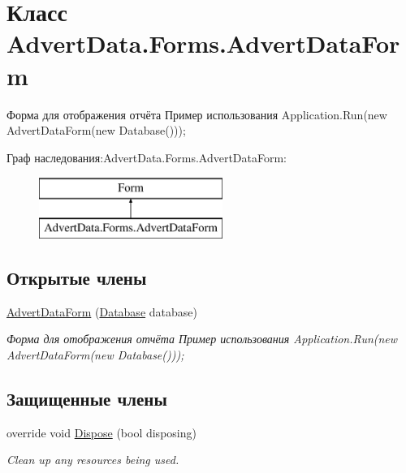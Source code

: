 \hypertarget{class_advert_data_1_1_forms_1_1_advert_data_form}{\section{Класс Advert\+Data.\+Forms.\+Advert\+Data\+Form}
\label{class_advert_data_1_1_forms_1_1_advert_data_form}
}


Форма для отображения отчёта Пример использования Application.\+Run(new Advert\+Data\+Form(new Database()));  


Граф наследования\+:Advert\+Data.\+Forms.\+Advert\+Data\+Form\+:\begin{figure}[H]
\begin{center}
\leavevmode
\includegraphics[height=2.000000cm]{class_advert_data_1_1_forms_1_1_advert_data_form}
\end{center}
\end{figure}
\subsection*{Открытые члены}
\begin{DoxyCompactItemize}
\item 
\hyperlink{class_advert_data_1_1_forms_1_1_advert_data_form_ade74bad239228075b06f23f00652bb55}{Advert\+Data\+Form} (\hyperlink{class_advert_data_1_1_database}{Database} database)
\begin{DoxyCompactList}\small\item\em Форма для отображения отчёта Пример использования Application.\+Run(new Advert\+Data\+Form(new Database())); \end{DoxyCompactList}\end{DoxyCompactItemize}
\subsection*{Защищенные члены}
\begin{DoxyCompactItemize}
\item 
override void \hyperlink{class_advert_data_1_1_forms_1_1_advert_data_form_a657f930ffab20a51d5f5949e7e1c0922}{Dispose} (bool disposing)
\begin{DoxyCompactList}\small\item\em Clean up any resources being used. \end{DoxyCompactList}\end{DoxyCompactItemize}

